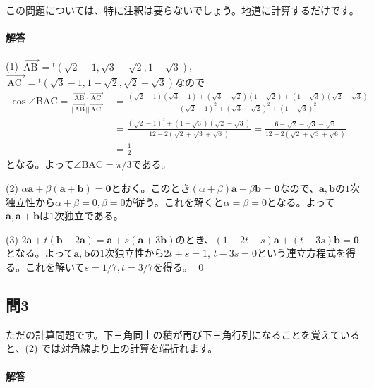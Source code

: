 この問題については、特に注釈は要らないでしょう。地道に計算するだけです。

\paragraph{解答}

\noindent (1) 
$\overrightarrow{\mathrm{\,AB\,}} = {}^t(\sqrt{2} - 1 ,\sqrt{3} - \sqrt{2} ,1 - \sqrt{3})$, $\overrightarrow{\mathrm{\,AC\,\,}} = {}^t(\sqrt{3} - 1, 1 - \sqrt{2}, \sqrt{2} - \sqrt{3})$なので
\begin{align*}
\cos\angle\mathrm{BAC} = \frac{\overrightarrow{\mathrm{\,AB\,}}\cdot \overrightarrow{\mathrm{\,AC\,\,}}}{\bigl|\overrightarrow{\mathrm{\,AB\,}}\bigr|\bigl|\overrightarrow{\mathrm{\,AC\,\,}}\bigr|}
&= \frac{(\sqrt{2} - 1)(\sqrt{3} - 1) + (\sqrt{3} - \sqrt{2})(1 - \sqrt{2}) + (1 - \sqrt{3})(\sqrt{2} - \sqrt{3})}{(\sqrt{2} - 1)^2 + (\sqrt{3} - \sqrt{2})^2 + (1 - \sqrt{3})^2} \\
&= \frac{(\sqrt{2} - 1)^2 + (1 - \sqrt{3})(\sqrt{2} - \sqrt{3})}{12 - 2(\sqrt{2} + \sqrt{3} + \sqrt{6})}
= \frac{6 - \sqrt{2} - \sqrt{3} - \sqrt{6}}{12 - 2(\sqrt{2} + \sqrt{3} + \sqrt{6})} \\
&= \frac{1}{2}
\end{align*}
となる。よって$\angle\mathrm{BAC} = \pi/3$である。

\noindent (2) $\alpha \bm{a} + \beta (\bm{a} + \bm{b}) = \bm{0}$とおく。このとき$(\alpha + \beta)\bm{a} + \beta \bm{b} = \bm{0}$なので、$\bm{a}, \bm{b}$の$1$次独立性から$\alpha + \beta = 0, \beta = 0$が従う。これを解くと$\alpha = \beta = 0$となる。よって$\bm{a}, \bm{a} + \bm{b}$は$1$次独立である。

\noindent (3) $2\bm{a} + t(\bm{b} - 2\bm{a}) = \bm{a} + s(\bm{a} + 3\bm{b})$のとき、$(1 - 2t - s)\bm{a} + (t - 3s)\bm{b} = \bm{0}$となる。よって$\bm{a}, \bm{b}$の$1$次独立性から$2t + s = 1$, $t - 3s = 0$という連立方程式を得る。これを解いて$s = 1/7, t = 3/7$を得る。 \qed

\subsection{問3} ただの計算問題です。下三角同士の積が再び下三角行列になることを覚えていると、(2) では対角線より上の計算を端折れます。

\paragraph{解答}

